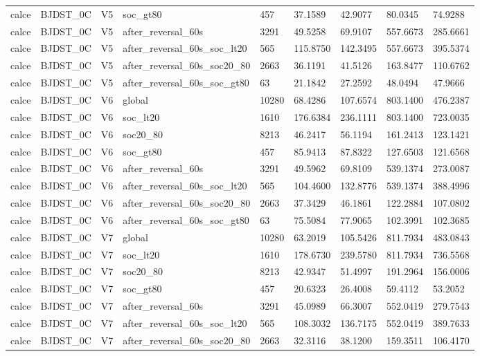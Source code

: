 \begin{tabular}{lllllllll}
calce & BJDST\_0C & V5 & soc\_gt80 & 457 & 37.1589 & 42.9077 & 80.0345 & 74.9288 \\
calce & BJDST\_0C & V5 & after\_reversal\_60s & 3291 & 49.5258 & 69.9107 & 557.6673 & 285.6661 \\
calce & BJDST\_0C & V5 & after\_reversal\_60s\_soc\_lt20 & 565 & 115.8750 & 142.3495 & 557.6673 & 395.5374 \\
calce & BJDST\_0C & V5 & after\_reversal\_60s\_soc20\_80 & 2663 & 36.1191 & 41.5126 & 163.8477 & 110.6762 \\
calce & BJDST\_0C & V5 & after\_reversal\_60s\_soc\_gt80 & 63 & 21.1842 & 27.2592 & 48.0494 & 47.9666 \\
calce & BJDST\_0C & V6 & global & 10280 & 68.4286 & 107.6574 & 803.1400 & 476.2387 \\
calce & BJDST\_0C & V6 & soc\_lt20 & 1610 & 176.6384 & 236.1111 & 803.1400 & 723.0035 \\
calce & BJDST\_0C & V6 & soc20\_80 & 8213 & 46.2417 & 56.1194 & 161.2413 & 123.1421 \\
calce & BJDST\_0C & V6 & soc\_gt80 & 457 & 85.9413 & 87.8322 & 127.6503 & 121.6568 \\
calce & BJDST\_0C & V6 & after\_reversal\_60s & 3291 & 49.5962 & 69.8109 & 539.1374 & 273.0087 \\
calce & BJDST\_0C & V6 & after\_reversal\_60s\_soc\_lt20 & 565 & 104.4600 & 132.8776 & 539.1374 & 388.4996 \\
calce & BJDST\_0C & V6 & after\_reversal\_60s\_soc20\_80 & 2663 & 37.3429 & 46.1861 & 122.2884 & 107.0802 \\
calce & BJDST\_0C & V6 & after\_reversal\_60s\_soc\_gt80 & 63 & 75.5084 & 77.9065 & 102.3991 & 102.3685 \\
calce & BJDST\_0C & V7 & global & 10280 & 63.2019 & 105.5426 & 811.7934 & 483.0843 \\
calce & BJDST\_0C & V7 & soc\_lt20 & 1610 & 178.6730 & 239.5780 & 811.7934 & 736.5568 \\
calce & BJDST\_0C & V7 & soc20\_80 & 8213 & 42.9347 & 51.4997 & 191.2964 & 156.0006 \\
calce & BJDST\_0C & V7 & soc\_gt80 & 457 & 20.6323 & 26.4008 & 59.4112 & 53.2052 \\
calce & BJDST\_0C & V7 & after\_reversal\_60s & 3291 & 45.0989 & 66.3007 & 552.0419 & 279.7543 \\
calce & BJDST\_0C & V7 & after\_reversal\_60s\_soc\_lt20 & 565 & 108.3032 & 136.7175 & 552.0419 & 389.7633 \\
calce & BJDST\_0C & V7 & after\_reversal\_60s\_soc20\_80 & 2663 & 32.3116 & 38.1200 & 159.3511 & 106.4170 \\

\end{tabular}
